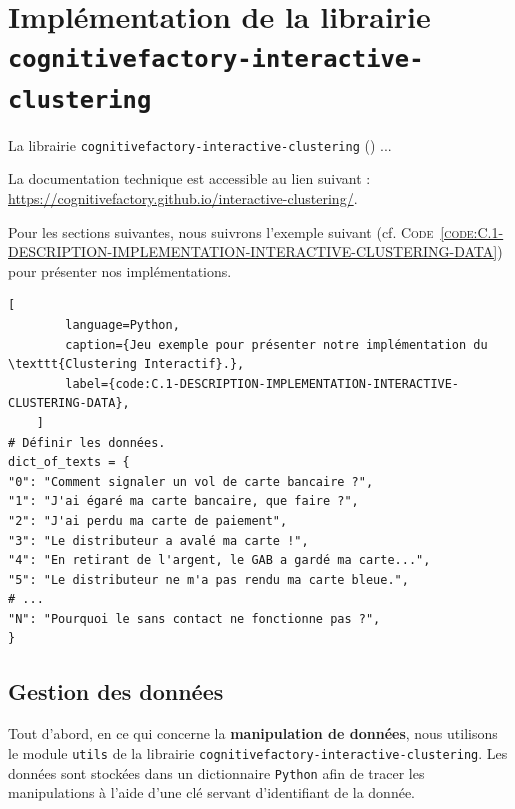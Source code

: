 \section{Implémentation de la librairie \\ \texttt{cognitivefactory-interactive-clustering}}
\label{annex:C.1-DESCRIPTION-IMPLEMENTATION-INTERACTIVE-CLUSTERING}
	
	La librairie \texttt{cognitivefactory-interactive-clustering} (\cite{schild:2022:cognitivefactory-interactiveclustering}) ...
	
	\begin{leftBarInformation}
		La documentation technique est accessible au lien suivant : \url{https://cognitivefactory.github.io/interactive-clustering/}.
	\end{leftBarInformation}
	
	Pour les sections suivantes, nous suivrons l'exemple suivant (cf. \textsc{Code~\ref{code:C.1-DESCRIPTION-IMPLEMENTATION-INTERACTIVE-CLUSTERING-DATA}}) pour présenter nos implémentations.
	
	\begin{lstlisting}[
		language=Python,
		caption={Jeu exemple pour présenter notre implémentation du \texttt{Clustering Interactif}.},
		label={code:C.1-DESCRIPTION-IMPLEMENTATION-INTERACTIVE-CLUSTERING-DATA},
	]
# Définir les données.
dict_of_texts = {
"0": "Comment signaler un vol de carte bancaire ?",
"1": "J'ai égaré ma carte bancaire, que faire ?",
"2": "J'ai perdu ma carte de paiement",
"3": "Le distributeur a avalé ma carte !",
"4": "En retirant de l'argent, le GAB a gardé ma carte...",
"5": "Le distributeur ne m'a pas rendu ma carte bleue.",
# ...
"N": "Pourquoi le sans contact ne fonctionne pas ?",
}
	\end{lstlisting}
	
	
	\subsection{Gestion des données}
	\label{annex:C.1.1-DESCRIPTION-IMPLEMENTATION-INTERACTIVE-CLUSTERING-GESTION-DES-DONNEES}
	
	Tout d'abord, en ce qui concerne la \textbf{manipulation de données}, nous utilisons le module \texttt{utils} de la librairie \texttt{cognitivefactory-interactive-clustering}.
	Les données sont stockées dans un dictionnaire \texttt{Python} afin de tracer les manipulations à l'aide d'une clé servant d'identifiant de la donnée.
	
